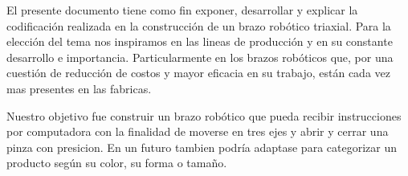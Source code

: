 El presente documento tiene como fin exponer, desarrollar y explicar la codificación realizada en la construcción de un brazo robótico triaxial.
Para la elección del tema nos inspiramos en las lineas de producción y en su constante desarrollo e importancia. Particularmente en los brazos robóticos que, por una cuestión de reducción de costos y mayor eficacia en su trabajo, están cada vez mas presentes en las fabricas.
\par
Nuestro objetivo fue construir un brazo robótico que pueda recibir instrucciones por computadora con la finalidad de moverse en tres ejes y abrir y cerrar una pinza con presicion. En un futuro tambien podría adaptase para categorizar un producto según su color, su forma o tamaño. 
